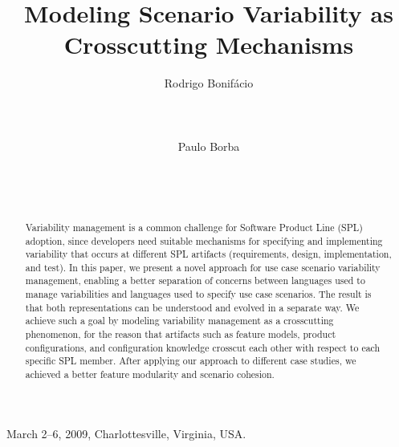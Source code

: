 \documentclass{acm_proc_article-sp}
\begin{document}
 {March 2--6, 2009, Charlottesville, Virginia, USA.} 


\lstset{language=Haskell, numbers=left,
numberstyle=\tiny,numbersep=5pt,basicstyle=\scriptsize,aboveskip=20pt}

\title{Modeling Scenario Variability as Crosscutting Mechanisms}



\author{
\alignauthor
Rodrigo Bonif\'{a}cio\\
       \\
       \\
       \\
\alignauthor
Paulo Borba\\
       \\
       \\
       \\
}

\maketitle

\begin{abstract}
Variability management is a common challenge for Software Product
Line (SPL) adoption, since developers need suitable
mechanisms for specifying and implementing variability
that occurs at different SPL artifacts (requirements, design,
implementation, and test). In this paper, we present a novel approach for
use case scenario variability management, enabling a better
separation of concerns between languages used to manage
variabilities and languages used to specify use case scenarios. The
result is that both representations can be understood and evolved in
a separate way. We achieve such a goal by modeling variability management
as a crosscutting phenomenon, for the reason that artifacts such as feature models,
product configurations, and configuration knowledge crosscut each
other with respect to each specific SPL member. After applying our approach to
different case studies, we achieved a better feature modularity and scenario cohesion.
\end{abstract}
\end{document}
